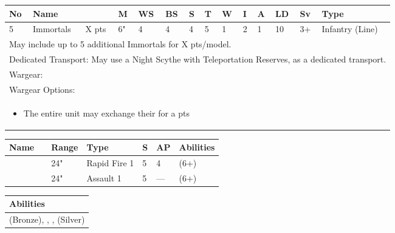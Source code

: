\newpage
{}

\noindent
\begin{tabular}{||m{10pt} m{95pt} m{30pt} m{11pt} m{11pt} m{11pt} m{11pt} m{11pt} m{11pt} m{11pt} m{11pt} m{11pt} m{11pt} m{125pt}||}
	\hline
	No & Name & & M & WS & BS & S & T & W & I & A & LD & Sv & Type \\
	\hline
	5 & Immortals & X pts & 6" & 4 & 4 & 4 & 5 & 1 & 2 & 1 & 10 & 3+ & Infantry (Line)\\
	\hline
	\hline
	\multicolumn{14}{||Z{532 pt}||}{May include up to 5 additional Immortals for X pts/model.}\\	
	\multicolumn{14}{||Z{532 pt}||}{Dedicated Transport: May use a Night Scythe with Teleportation Reserves, as a dedicated transport.}\\	
	\hline
	\hline
	\multicolumn{14}{||Z{532 pt}||}{Wargear: \quickref{Gauss Blaster}}\\
	\multicolumn{14}{||Z{532 pt}||}{Wargear Options:} \\	\multicolumn{14}{||Z{532 pt}||}{\begin{itemize}
			\item The entire unit may exchange their \quickref{Gauss Blaster} for a \quickref{Tesla Carbine} \hrulefill 0 pts
	\end{itemize}} \\
	\hline
\end{tabular}

\noindent
\begin{tabular}{||m{110pt} m{30pt} m{31pt} m{55pt} m{12pt} m{12pt} m{210pt}||}
	\hline
	Name & & Range & Type & S & AP & Abilities \\
	\hline
	\quickref{Gauss Blaster} & & 24" & Rapid Fire 1 & 5 & 4 & \quickref{Gauss} (6+) \\
	\quickref{Tesla Carbine} & & 24" & Assault 1 & 5 & — & \quickref{Tesla} (6+) \\
	\hline
\end{tabular}

\noindent
\begin{tabular}{||m{532pt}||}
	\hline
	Abilities \\
	\hline
	\quickref{Awakening Protocols} (Bronze), \quickref{Living Metal}, \quickref{Reanimation Protocols}, \quickref{Soulless Hordes} (Silver) \\
	\hline
\end{tabular}